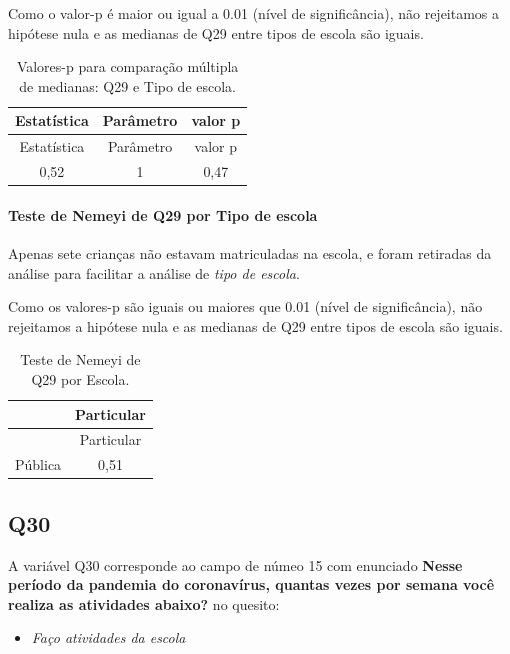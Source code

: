\documentclass[]{article}
\providecommand{\tightlist}{%
  \setlength{\itemsep}{0pt}\setlength{\parskip}{0pt}}
\let\oldparagraph\paragraph
\renewcommand{\paragraph}[1]{\oldparagraph{#1}\mbox{}}
\begin{document}
Como o valor-p é maior ou igual a 0.01 (nível de significância), não rejeitamos a hipótese nula e as medianas de Q29 entre tipos de escola são iguais.

\begin{longtable}[]{@{}ccc@{}}
\caption{\label{tab:unnamed-chunk-944}Valores-p para comparação múltipla de medianas: Q29 e Tipo de escola.}\tabularnewline
\toprule
Estatística & Parâmetro & valor p\tabularnewline
\midrule
\endfirsthead
\toprule
Estatística & Parâmetro & valor p\tabularnewline
\midrule
\endhead
0,52 & 1 & 0,47\tabularnewline
\bottomrule
\end{longtable}

\hypertarget{teste-de-nemeyi-de-q29-por-tipo-de-escola}{%
\paragraph{Teste de Nemeyi de Q29 por Tipo de escola}\label{teste-de-nemeyi-de-q29-por-tipo-de-escola}}

Apenas sete crianças não estavam matriculadas na escola, e foram retiradas da análise para facilitar a análise de \emph{tipo de escola}.

Como os valores-p são iguais ou maiores que 0.01 (nível de significância), não rejeitamos a hipótese nula e as medianas de Q29 entre tipos de escola são iguais.

\begin{longtable}[]{@{}lc@{}}
\caption{\label{tab:unnamed-chunk-946}Teste de Nemeyi de Q29 por Escola.}\tabularnewline
\toprule
& Particular\tabularnewline
\midrule
\endfirsthead
\toprule
& Particular\tabularnewline
\midrule
\endhead
Pública & 0,51\tabularnewline
\bottomrule
\end{longtable}

\cleardoublepage

\hypertarget{q30}{%
\subsection{Q30}\label{q30}}

A variável Q30 corresponde ao campo de númeo 15 com enunciado \textbf{Nesse período da pandemia do coronavírus, quantas vezes por semana você realiza as atividades abaixo?} no quesito:

\begin{itemize}
\tightlist
\item
  \emph{Faço atividades da escola}
\end{itemize}
\end{document}
